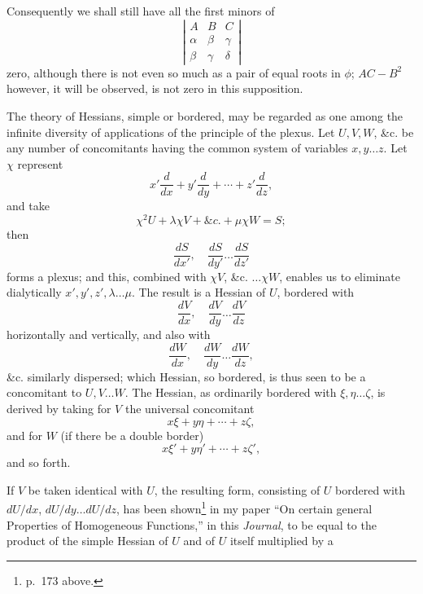\documentclass[11pt]{article}
\newcommand{\sourcepage}[1]{\marginpar{\scriptsize p.~#1}}
\begin{document}
{{\sourcepage{350}
Consequently we shall still have all the first minors of
\[
\left|\begin{array}{ccc}
A&B&C\\
\alpha&\beta&\gamma\\
\beta&\gamma&\delta
\end{array}\right|
\]
zero, although there is not even so much as a pair of equal roots in $\phi$; $AC-B^2$ however, it will be observed, is not zero in this supposition.

The theory of Hessians, simple or bordered, may be regarded as one among the infinite diversity of applications of the principle of the plexus. Let $U,V,W$, \&c. be any number of concomitants having the common system of variables $x,y\ldots z$. Let $\chi$ represent
\[
x'\frac{d}{dx}+y'\frac{d}{dy}+\cdots+z'\frac{d}{dz},
\]
and take
\[
\chi^2U+\lambda\chi V+\&c.+\mu\chi W=S;
\]
then
\[
\frac{dS}{dx'},\quad \frac{dS}{dy'}\ldots \frac{dS}{dz'}
\]
forms a plexus; and this, combined with $\chi V$, \&c. $\ldots \chi W$, enables us to eliminate dialytically $x',y',z',\lambda\ldots\mu$. The result is a Hessian of $U$, bordered with
\[
\frac{dV}{dx},\quad \frac{dV}{dy}\ldots \frac{dV}{dz}
\]
horizontally and vertically, and also with
\[
\frac{dW}{dx},\quad \frac{dW}{dy}\ldots \frac{dW}{dz},
\]
\&c. similarly dispersed; which Hessian, so bordered, is thus seen to be a concomitant to $U,V\ldots W$. The Hessian, as ordinarily bordered with $\xi,\eta\ldots\zeta$, is derived by taking for $V$ the universal concomitant
\[
x\xi+y\eta+\cdots+z\zeta,
\]
and for $W$ (if there be a double border)
\[
x\xi'+y\eta'+\cdots+z\zeta',
\]
and so forth.

If $V$ be taken identical with $U$, the resulting form, consisting of $U$ bordered with $dU/dx$, $dU/dy\ldots dU/dz$, has been shown\footnote{p.~173 above.} in my paper ``On certain general Properties of Homogeneous Functions,'' in this \emph{Journal}, to be equal to the product of the simple Hessian of $U$ and of $U$ itself multiplied by a

}}
\end{document}
